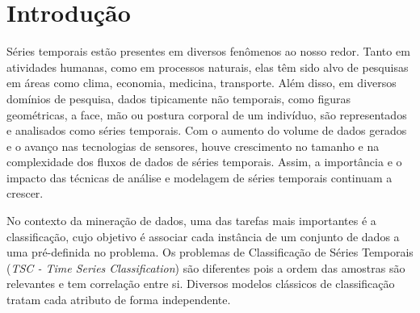 
\chapter{Introdução} %


Séries temporais estão presentes em diversos fenômenos ao nosso redor. Tanto em atividades humanas, como em processos naturais, elas têm sido alvo de pesquisas em áreas como clima, economia, medicina, transporte. Além disso, em diversos domínios de pesquisa, dados tipicamente não temporais, como figuras geométricas, a face, mão ou postura corporal de um indivíduo, são representados e analisados como séries temporais. Com o aumento do volume de dados gerados e o avanço nas tecnologias de sensores, houve crescimento no tamanho e na complexidade dos fluxos de dados de séries temporais. Assim, a importância e o impacto das técnicas de análise e modelagem de séries temporais continuam a crescer. 

No contexto da mineração de dados, uma das tarefas mais importantes é a classificação, cujo objetivo é associar cada instância de um conjunto de dados a uma pré-definida no problema. Os problemas de Classificação de Séries Temporais (\textit{TSC - Time Series Classification}) são diferentes pois a ordem das amostras são relevantes e tem correlação entre si. Diversos modelos clássicos de classificação tratam cada atributo de forma independente.  

